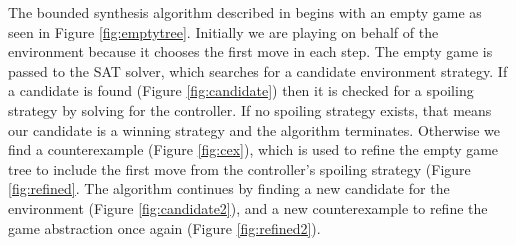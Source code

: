 \documentclass{llncs}
\begin{document}
The bounded synthesis algorithm described in \cite{narodytska2014} begins with
an empty game as seen in Figure \ref{fig:emptytree}.  Initially we are playing
on behalf of the environment because it chooses the first move in each step.
The empty game is passed to the SAT solver, which searches for a candidate
environment strategy.  If a candidate is found (Figure \ref{fig:candidate})
then it is checked for a spoiling strategy by solving for the controller.  If
no spoiling strategy exists, that means our candidate is a winning strategy and
the algorithm terminates.  Otherwise we find a counterexample (Figure
\ref{fig:cex}), which is used to refine the empty game tree to include the
first move from the controller's spoiling strategy (Figure \ref{fig:refined}.
The algorithm continues by finding a new candidate for the environment (Figure
\ref{fig:candidate2}), and a new counterexample to refine the game abstraction
once again (Figure \ref{fig:refined2}).
\end{document}
